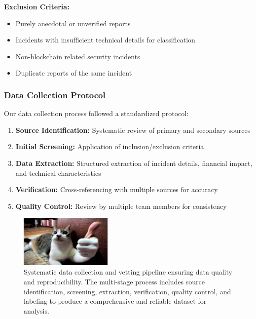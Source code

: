 \textbf{Exclusion Criteria:}
\begin{itemize}
    \item Purely anecdotal or unverified reports
    \item Incidents with insufficient technical details for classification
    \item Non-blockchain related security incidents
    \item Duplicate reports of the same incident
\end{itemize}

\subsubsection{Data Collection Protocol}
Our data collection process followed a standardized protocol:
\begin{enumerate}
    \item \textbf{Source Identification:} Systematic review of primary and secondary sources
    \item \textbf{Initial Screening:} Application of inclusion/exclusion criteria
    \item \textbf{Data Extraction:} Structured extraction of incident details, financial impact, and technical characteristics
    \item \textbf{Verification:} Cross-referencing with multiple sources for accuracy
    \item \textbf{Quality Control:} Review by multiple team members for consistency
\end{enumerate}


\begin{figure}[H]
\centering
\includegraphics[width=0.4\textwidth]{../figure/fig2.png}
\caption{Systematic data collection and vetting pipeline ensuring data quality and reproducibility. The multi-stage process includes source identification, screening, extraction, verification, quality control, and labeling to produce a comprehensive and reliable dataset for analysis.}
\label{fig:data_pipeline}
\end{figure}
